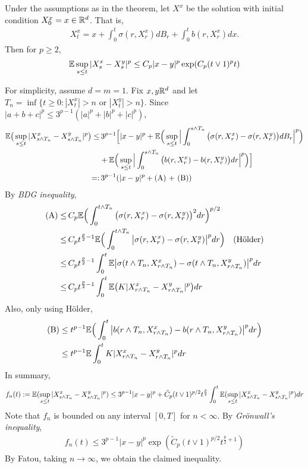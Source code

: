 \documentclass[12pt,a4paper]{article}
\newenvironment{proof}
{\begin{changemargin}{0.5cm}{0.5cm} 
	}%
	{\end{changemargin}
}
\newenvironment{p}
{\begin{proof} 
	}%
	{\end{proof}
}
\begin{document}
\prop Under the assumptions as in the theorem, let $X^x$ be the solution with initial condition $X_0^x =x \in \mathbb{R}^d$. That is,
\begin{align*}
X_t^x = x+ \int_0^t \sigma(r, X_r^x) dB_r + \int_0^t b(r, X_r^x) dx.
\end{align*}
Then for $p\geq 2$,
\begin{align*}
\mathbb{E} \sup_{s\leq t} |X_s^x - X_s^y|^p \leq C_p |x-y|^p \exp (C_p (t\vee 1)^p t)
\end{align*}
\begin{p}
\pf For simplicity, assume $d=m=1$. Fix $x, y\mathbb{R}^d$ and let $T_n =\inf \{t\geq 0 : |X_t^x|>n \text{ or } |X_t^y| >n \}$. Since $|a+b+c|^p \leq 3^{p-1}(|a|^p + |b|^p + |c|^p)$,
\begin{align*}
\mathbb{E} \big( \sup_{s\leq t} |X^x_{s\wedge T_n} -  X^y_{s\wedge T_n}|^p  \big) \leq & \,3^{p-1} \Big[ |x-y|^p + \mathbb{E} \Big( \sup_{s\leq t} \Big| \int_0^{s\wedge T_n} \big( \sigma(r, X_r^x) - \sigma(r, X_r^y)\big) dB_r \Big|^p \Big) \\
& + \mathbb{E} \Big( \sup_{s\leq t} \Big| \int_0^{s\wedge T_n} \big( b(r, X_r^x) - b(r, X_r^y)\big) dr \Big|^p \Big) \Big] \\
=: & \, 3^{p-1}( |x-y|^p + \text{(A) + (B)} )
\end{align*}
By \emph{BDG inequality},
\begin{align*}
\text{(A)} \leq &\, C_p \mathbb{E} \Big( \int_0^{t\wedge T_n} \big( \sigma(r, X_r^x) - \sigma(r, X_r^y) \big)^2 dr \Big)^{p/2} \\
\leq &\, C_p t^{\frac{p}{2} -1} \mathbb{E} \Big( \int_0^{t\wedge T_n} \big| \sigma(r, X_r^x) - \sigma(r, X_r^y) \big|^p dr \Big) \quad \text{(H\"older)} \\
\leq &\, C_p t^{\frac{p}{2} - 1} \int_0^t \mathbb{E} \big| \sigma(t \wedge T_n, X_{r\wedge T_n}^x) -\sigma(t \wedge T_n, X_{r\wedge T_n}^y) \big|^p dr \\
\leq &\, C_p t^{\frac{p}{2} - 1} \int_0^t \mathbb{E} \big( K |X^x_{r\wedge T_n} - X^y_{r\wedge T_n}|^p \big) dr
\end{align*}
Also, only using H\"older,
\begin{align*}
\text{(B)} & \leq t^{p-1} \mathbb{E} \Big(\int_0^t \big| b(r\wedge T_n, X^x_{r\wedge T_n}) - b(r\wedge T_n, X^y_{r\wedge T_n})\big|^p dr \Big) \\
& \leq t^{p-1} \mathbb{E} \int_0^t K |X^x_{r\wedge T_n} - X^y_{r\wedge T_n}|^p dr
\end{align*}
In summary,
\begin{align*}
f_n(t) := \mathbb{E} (\sup_{s\leq t} |X^x_{s\wedge T_n} - X^y_{s\wedge T_n}|^p ) \leq 3^{p-1} |x-y|^p + \tilde{C}_p (t\vee 1)^{p/2} t^{\frac{p}{2}} \int_0^t \mathbb{E} (\sup_{s\leq t} |X^x_{s\wedge T_n} - X^y_{s\wedge T_n}|^p) dr
\end{align*}
Note that $f_n$ is bounded on any interval $[0, T]$ for $n< \infty$. By \emph{Gr\"onwall's inequality}, 
\begin{align*}
f_n(t) \leq 3^{p-1} |x-y|^p \exp (\tilde{C}_p (t\vee 1)^{p/2} t^{\frac{p}{2}+1})
\end{align*}
By Fatou, taking $n\rightarrow \infty$, we obtain the claimed inequality. 

\eop
\end{p}
\s
\end{document}
